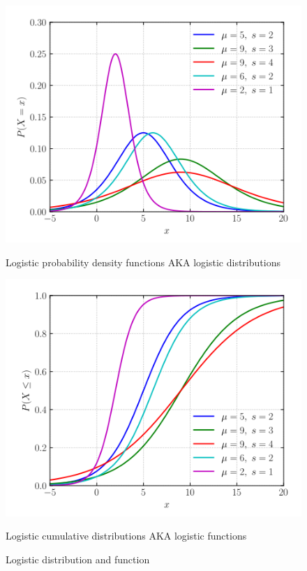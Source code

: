 \begin{enumerate}
\begin{figure}[H]
            \begin{minipage}[t]{0.49\textwidth}
                \centering
                \includegraphics[width=1\textwidth]{LogisticProbDens}
                \caption{Logistic probability density functions AKA logistic distributions}
                \label{subfig: logistic prob distribution}
            \end{minipage}
            \hfill
            \begin{minipage}[t]{0.49\textwidth}
                \centering
                \includegraphics[width=1\textwidth]{LogisticCumDist}
                \caption{Logistic cumulative distributions AKA logistic functions}
                \label{subfig: logistic CDF}
            \end{minipage}
            \caption{Logistic distribution and function}
            \label{fig: logDistFunc}
        \end{figure}


\end{enumerate}
